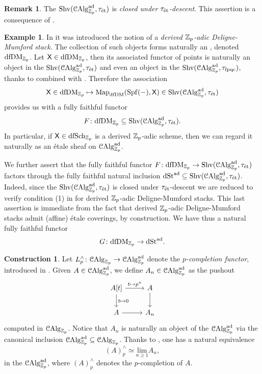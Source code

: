 \documentclass[10pt,a4paper]{amsart}
\numberwithin{equation}{subsection}
\theoremstyle{definition}
\newtheorem{remark}[theorem]{Remark}
\newtheorem{example}[theorem]{Example}
\newtheorem{construction}[theorem]{Construction}
\def\lim{\mathrm{lim}}
\begin{document}
\begin{remark}
    The \infcat $\mathrm{Shv}(\mathcal C \mathrm{Alg}^{\mathrm{ad}}_{\mathbb Z_p}, \tau_{\text{\'et}})$ is \emph{closed under $\tau_{\text{\'et}}$-descent}. This assertion is a consequence of \cite[Proposition 5.16, (3)]{Lurie_Spectral_Schemes}.
\end{remark}

\begin{example}
    In \cite[Definition 3.2.10]{antonio2018p} it was introduced the notion of a \emph{derived $\mathbb Z_p$-adic Deligne-Mumford stack}. The collection of such objects forms naturally an \infcat, denoted $\mathrm{dfDM}_{\mathbb Z_p}$.
    Let $\mathsf{X} \in \mathrm{dfDM}_{\mathbb Z_p}$, then its associated functor of points is naturally an object in the \infcat $\mathrm{Shv}(\mathcal C \mathrm{Alg}^{\mathrm{ad}}_{\mathbb Z_p}, \tau_{\text{\'et}})$ and even an object in the \infcat $\mathrm{Shv}(\mathcal C \mathrm{Alg}^{\mathrm{ad}}_{\mathbb Z_p}, \tau_{\mathrm{fpqc}})$, thanks to \cite[Theorem 5.15]{Lurie_Spectral_Schemes} combined with \cite[Proposition 8.1.2.1]{lurie2016spectral}.
    Therefore the association 
        \[
            \mathsf{X} \in \mathrm{dfDM}_{\mathbb Z_p} \mapsto \mathrm{Map}_{\mathrm{dfDM}}(\operatorname{Spf}(-), \mathsf{X}) \in \mathrm{Shv}(\mathcal C \mathrm{Alg}^{\mathrm{ad}}_{\mathbb Z_p}, \tau_{\text{\'et}})  
        \]
    provides us with a fully faithful functor 
        \[
            F \colon \mathrm{dfDM}_{\mathbb Z_p} \subseteq \mathrm{Shv}(\mathcal C \mathrm{Alg}^{\mathrm{ad}}_{\mathbb Z_p}, \tau_{\text{\'et}}).
        \]
    In particular, if $\mathsf{X} \in \mathrm{dfSch}_{\mathbb Z_p}$ is a derived $\mathbb Z_p$-adic scheme, then we can regard it naturally
    as an \'etale sheaf on $\mathcal C \mathrm{Alg}^{\mathrm{ad}}_{\mathbb Z_p}$.

    We further assert that the fully faithful functor $F \colon \mathrm{dfDM}_{\mathbb Z_p} \to \mathrm{Shv}(\mathcal C \mathrm{Alg}^{\mathrm{ad}}_{\mathbb Z_p}, \tau_{\text{\'et}})$ factors through the fully faithful natural inclusion $\mathrm{dSt}^{\mathrm{ad}} \subseteq \mathrm{Shv}(\mathcal C \mathrm{Alg}^{\mathrm{ad}}_{\mathbb Z_p}, \tau_{\text{\'et}})$.
    Indeed, since the \infcat $\mathrm{Shv}(\mathcal C \mathrm{Alg}^{\mathrm{ad}}_{\mathbb Z_p}, \tau_{\text{\'et}})$ is closed under $\tau_{\text{\'et}}$-descent we are reduced to verify condition (1) in \cite[Definition 2.3.3]{antonio2017moduli} for derived $\mathbb Z_p$-adic Deligne-Mumford stacks. This last assertion is immediate from the fact that derived $\mathbb Z_p$-adic Deligne-Mumford stacks admit
    (affine) \'etale coverings, by construction. We have thus a natural fully faithful functor
        \[
                G \colon \mathrm{dfDM}_{\mathbb Z_p} \to \mathrm{dSt}^{\mathrm{ad}}.    
        \] 
\end{example}

\begin{construction}
    Let $
            L_p^\wedge \colon \mathcal{C}\mathrm{Alg}_{\mathbb Z_p} \to \mathcal C \mathrm{Alg}^{\mathrm{ad}}_{\mathbb Z_p}
        $
    denote the \emph{$p$-completion functor}, introduced in \cite[\S 8]{lurie2016spectral}. Given $A \in \mathcal C \mathrm{Alg}^{\mathrm{ad}}_{\mathbb Z_p}$, we define $A_n \in \mathcal C \mathrm{Alg}^{\mathrm{ad}}_{\mathbb Z_p}$ as the pushout
        \[
        \begin{tikzcd}
            A[t] \ar{r}{t \mapsto p^n} \ar{d}{t \mapsto 0} & A \ar{d} \\
            A \ar{r} & A_n
        \end{tikzcd}
        \]    
    computed in \infcat $\mathcal{C}\mathrm{Alg}_{\mathbb Z_p}$. Notice that $A_n$ is naturally an object of the \infcat $\mathcal C \mathrm{Alg}^{\mathrm{ad}}_{\mathbb Z_p}$ via the canonical inclusion $\mathcal C \mathrm{Alg}^{\mathrm{ad}}_{\mathbb Z_p} \subseteq \mathcal{C}\mathrm{Alg}_{\mathbb Z_p}$.
    Thanks to \cite[Lemma 8.1.2.3]{lurie2016spectral}, one has a natural equivalence
        \[
            (A)^\wedge_p \simeq \underset{n\geq 1}{\lim} A_n,  
        \]
    in the \infcat $\mathcal C \mathrm{Alg}^{\mathrm{ad}}_{\mathbb Z_p}$, where $(A)^\wedge_p$ denotes the $p$-completion of $A$.
\end{construction}
\end{document}
